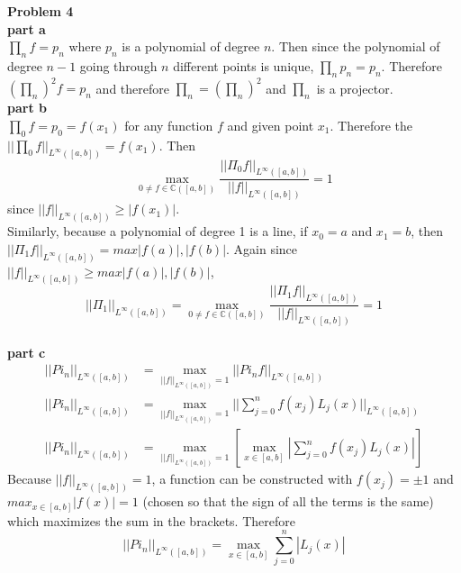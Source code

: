 \documentclass{article} %
\begin{document}
\textbf{Problem 4} \\
\textbf{part a} \\
$\prod_n f = p_n$ where $p_n$ is a polynomial of degree $n$.  Then since the polynomial of degree $n-1$ going through $n$ different points is unique, $\prod_n p_n = p_n$. Therefore $(\prod_n)^2 f = p_n$ and therefore $\prod_n = (\prod_n)^2$ and $\prod_n$ is a projector.
\\

\textbf{part b} \\
$\prod_0 f = p_0 = f(x_1)$ for any function $f$ and given point $x_1$.  Therefore the $||\prod_0 f||_{L^\infty ([a, b])} = f(x_1)$.  Then 
\begin{equation*}
\max_{0 \neq f \in \mathbb{C}([a, b])} \frac{||\Pi_0 f||_{L^\infty ([a, b])}}{||f||_{L^\infty ([a, b])}} = 1
\end{equation*}
since $||f||_{L^\infty ([a, b])} \geq |f(x_1)|$. \\
Similarly, because a polynomial of degree 1 is a line, if $x_0= a$ and $x_1 = b$, then $||\Pi_1 f||_{L^\infty ([a, b])} = max |f(a)|, |f(b)|$.  Again since $||f||_{L^\infty ([a, b])} \geq max |f(a)|, |f(b)|$, 
\begin{equation*}
||\Pi_1||_{L^\infty ([a, b])} = \max_{0 \neq f \in \mathbb{C}([a, b])} \frac{||\Pi_1 f||_{L^\infty ([a, b])}}{||f||_{L^\infty ([a, b])}} = 1
\end{equation*}
\\

\textbf{part c} \\
\begin{align*}
||Pi_n||_{L^\infty([a,b])} &= \max_{||f||_{L^\infty ([a,b])}=1} ||Pi_n f||_{L^\infty ([a,b])} \\
||Pi_n||_{L^\infty([a,b])} &= \max_{||f||_{L^\infty ([a,b])}=1} ||\sum_{j=0}^n f(x_j) L_j(x)||_{L^\infty ([a,b])} \\
||Pi_n||_{L^\infty([a,b])} &= \max_{||f||_{L^\infty ([a,b])}=1} \left[ \max_{x\in [a,b]} |\sum_{j=0}^n f(x_j) L_j(x)|\right]
\end{align*}
Because $||f||_{L^\infty ([a,b])}=1$, a function can be constructed with $f(x_j) = \pm 1$ and $max_{x\in [a,b]}|f(x)|=1$ (chosen so that the sign of all the terms is the same) which maximizes the sum in the brackets.  Therefore
\begin{equation*}
||Pi_n||_{L^\infty([a,b])} =  \max_{x\in [a,b]} \sum_{j=0}^n |L_j(x)|
\end{equation*}
\\
\end{document}
